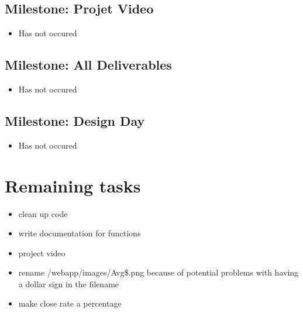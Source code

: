 \documentclass[11pt,a4paper,oneside]{article}
\begin{document}
\subsection{Milestone: Projet Video}
\begin{itemize}
\item Has not occured
\end{itemize}

\subsection{Milestone: All Deliverables}
\begin{itemize}
\item Has not occured
\end{itemize}

\subsection{Milestone: Design Day}
\begin{itemize}
\item Has not occured
\end{itemize}





\section{Remaining tasks}
\begin{itemize}
\item clean up code
\item write documentation for functions
\item project video
\item rename /webapp/images/Avg\$.png because of potential problems with having a dollar sign in the filename
\item make close rate a percentage
\end{itemize}
















\end{document}
